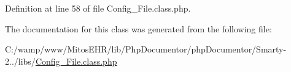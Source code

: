\-Definition at line 58 of file \-Config\-\_\-\-File.\-class.\-php.



\-The documentation for this class was generated from the following file\-:\begin{DoxyCompactItemize}
\item 
\-C\-:/wamp/www/\-Mitos\-E\-H\-R/lib/\-Php\-Documentor/php\-Documentor/\-Smarty-\/2../libs/\hyperlink{_config___file_8class_8php}{\-Config\-\_\-\-File.\-class.\-php}\end{DoxyCompactItemize}
